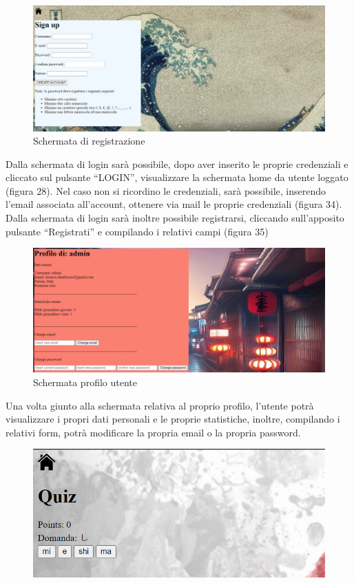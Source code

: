 \begin{figure}[!h]
\centering
\includegraphics[scale=0.70]{images/signUp.png}
\caption{Schermata di registrazione}
\label{fig:user_flow_guest}
\end{figure}
\noindent
\newpage
Dalla schermata di login sarà possibile, dopo aver inserito le proprie credenziali e cliccato sul pulsante “LOGIN”, visualizzare la schermata home da utente loggato (figura 28).
Nel caso non si ricordino le credenziali, sarà possibile, inserendo l’email associata all’account, ottenere via mail le proprie credenziali (figura 34).
Dalla schermata di login sarà inoltre possibile registrarsi, cliccando sull’apposito pulsante “Registrati” e compilando i relativi campi (figura 35)

\begin{figure}[!h]
\centering
\includegraphics[scale=0.70]{images/profilo.png}
\caption{Schermata profilo utente}
\label{fig:user_flow_guest}
\end{figure}
\noindent

Una volta giunto alla schermata relativa al proprio profilo, l’utente potrà visualizzare i propri dati personali e le proprie statistiche, inoltre, compilando i relativi form, potrà modificare la propria email o la propria password.


\begin{figure}[!h]
\centering
\includegraphics[scale=0.70]{images/quiz1.png}
\label{fig:user_flow_guest}
\end{figure}
\noindent


